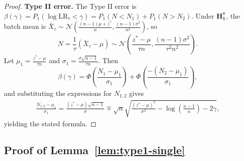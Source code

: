\documentclass{article}
\theoremstyle{plain}
\theoremstyle{definition}
\theoremstyle{remark}
\begin{document}
\begin{proof}
    \textbf{Type II error.} The Type II error is $\beta(\gamma) = P_1(\log \mathrm{LR}_\tau < \gamma) = P_1(N < N_1) + P_1(N > N_2)$. Under $\mathbf{H_1^\tau}$, the batch mean is $\bar{X}_\tau \sim \mathcal{N}\left(\frac{(n-1)\mu + z^*}{n}, \frac{(n-1)\sigma^2}{n^2}\right)$, so
    \begin{equation*}
        N = \frac{1}{\tau}(\bar{X}_\tau - \mu) \sim \mathcal{N}\left(\frac{z^* - \mu}{\tau n}, \frac{(n-1)\sigma^2}{\tau^2 n^2}\right).
    \end{equation*}
    Let $\mu_1 = \frac{z^* - \mu}{\tau n}$ and $\sigma_1 = \frac{\sigma\sqrt{n-1}}{\tau n}$. Then
    \begin{equation*}
        \beta(\gamma) = \Phi\left(\frac{N_1 - \mu_1}{\sigma_1}\right) + \Phi\left(\frac{-(N_2 - \mu_1)}{\sigma_1}\right),
    \end{equation*}
    and substituting the expressions for $N_{1,2}$ gives
    \begin{align*}
        \frac{N_{1,2} - \mu_1}{\sigma_1} = \frac{(z^* - \mu)\sqrt{n-1}}{\sigma} \mp \sqrt{n}\sqrt{\frac{(z^* - \mu)^2}{\sigma^2} - \log\left(\frac{n-1}{n}\right) - 2\gamma},
    \end{align*}
    yielding the stated formula.
\end{proof}

\subsection{Proof of Lemma~\ref{lem:type1-single}}
\label{app:proof-type1-single}

\typeisingle*
\end{document}
